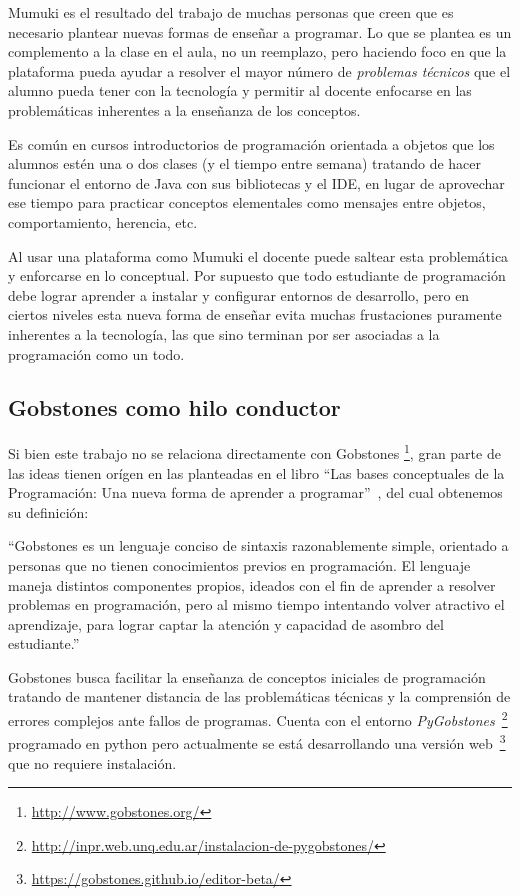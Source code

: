 Mumuki es el resultado del trabajo de muchas personas que creen
que es necesario plantear nuevas formas de enseñar a programar.
Lo que se plantea es un complemento a la clase en el aula, no
un reemplazo, pero haciendo foco en que la plataforma pueda ayudar
a resolver el mayor número de \textit{problemas técnicos}
que el alumno pueda tener con la tecnología y permitir al docente enfocarse
en las problemáticas inherentes a la enseñanza de los conceptos.

Es común en cursos introductorios de programación orientada a objetos que los alumnos
estén una o dos clases (y el tiempo entre semana) tratando de hacer funcionar
el entorno de Java con sus bibliotecas y el IDE, en lugar de
aprovechar ese tiempo para practicar conceptos elementales como mensajes
entre objetos, comportamiento, herencia, etc.

Al usar una plataforma como Mumuki el docente puede saltear esta problemática
y enforcarse en lo conceptual. Por supuesto que todo estudiante de programación
debe lograr aprender a instalar y configurar entornos de desarrollo, pero
en ciertos niveles esta nueva forma de enseñar evita muchas
frustaciones puramente inherentes a la tecnología,
las que sino terminan por ser asociadas a la programación como un todo.

\subsection{Gobstones como hilo conductor}

Si bien este trabajo no se relaciona directamente con Gobstones
\footnote{\url{http://www.gobstones.org/}},
gran parte de las ideas tienen orígen en las planteadas en el libro
\enquote{Las bases conceptuales de la Programación: Una nueva forma de aprender a programar}~\cite{LibroGobstones}, del cual obtenemos su definición:

\begin{displayquote}
``Gobstones es un lenguaje conciso de sintaxis razonablemente simple,
orientado a personas que no tienen conocimientos previos en programación.
El lenguaje maneja distintos componentes propios, ideados con el fin de
aprender a resolver problemas en programación,  pero al mismo tiempo
intentando volver atractivo el aprendizaje, para lograr captar la atención
y capacidad de asombro del estudiante.''
\end{displayquote}

Gobstones busca facilitar la enseñanza de conceptos iniciales de programación
tratando de mantener distancia de las problemáticas técnicas y
la comprensión de errores complejos ante fallos de programas.
Cuenta con el entorno \textit{PyGobstones}~\footnote{\url{http://inpr.web.unq.edu.ar/instalacion-de-pygobstones/}} programado en python
pero actualmente se está desarrollando una versión web~\footnote{\url{https://gobstones.github.io/editor-beta/}} que no requiere instalación.


